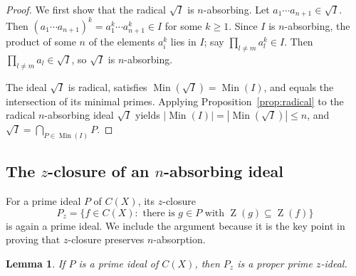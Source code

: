 \documentclass[11pt]{amsart}
\newtheorem{lemma}[theorem]{Lemma}
\theoremstyle{definition}
\theoremstyle{remark}
\DeclareMathOperator{\Min}{Min}
\DeclareMathOperator{\Z}{Z}
\begin{document}
\begin{proof}
We first show that the radical $\sqrt I$ is $n$-absorbing. Let
$a_1\cdots a_{n+1}\in\sqrt I$. Then
$(a_1\cdots a_{n+1})^k=a_1^k\cdots a_{n+1}^k\in I$ for some $k\ge1$.
Since $I$ is $n$-absorbing, the product of some $n$ of the elements
$a_i^k$ lies in $I$; say $\prod_{l\ne m}a_l^k\in I$. Then
$\prod_{l\ne m}a_l\in\sqrt I$, so $\sqrt I$ is $n$-absorbing.

The ideal $\sqrt I$ is radical, satisfies $\Min(\sqrt I)=\Min(I)$, and
equals the intersection of its minimal primes. Applying
Proposition~\ref{prop:radical} to the radical $n$-absorbing ideal
$\sqrt I$ yields $|\Min(I)|=|\Min(\sqrt I)|\le n$, and
$\sqrt I=\bigcap_{P\in\Min(I)}P$.
\end{proof}

\subsection{The \texorpdfstring{$z$}{z}-closure of an \texorpdfstring{$n$}{n}-absorbing ideal}

For a prime ideal $P$ of $C(X)$, its $z$-closure
\[
P_z=\{f\in C(X):\text{ there is }g\in P
                  \text{ with }\Z(g)\subseteq\Z(f)\}
\]
is again a prime ideal. We include the argument because it is the
key point in proving that $z$-closure preserves $n$-absorption.

\begin{lemma}
\label{lem:prime-z-closure}
If $P$ is a prime ideal of $C(X)$, then $P_z$ is a proper prime
$z$-ideal.
\end{lemma}
\end{document}
